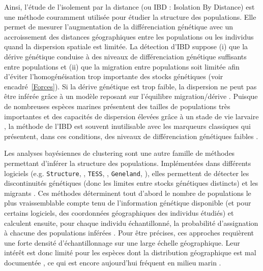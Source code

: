 \documentclass[a4paper,12pt,twoside]{article}\usepackage[]{graphicx}\usepackage[]{color}
\begin{document}
\begin {bibunit} [newbst]
Ainsi, l'étude de l'isolement par la distance (ou IBD : Isolation By Distance) est une méthode couramment utilisée pour étudier la structure des populations. Elle permet de mesurer l'augmentation de la différenciation génétique avec un accroissement des distances géographiques entre les populations \citep{rousset1997genetic} ou les individus \citep{rousset2000genetic} quand la dispersion spatiale est limitée. La détection d'IBD suppose (i) que la dérive génétique conduise à des niveaux de différenciation génétique suffisants entre populations et (ii) que la migration entre populations soit limitée afin d'éviter l'homogénéisation trop importante des stocks génétiques (voir encadré~\ref{Forces}). Si la dérive génétique est trop faible, la dispersion ne peut pas être inférée grâce à un modèle reposant sur l'équilibre migration/dérive \citep{gagnaire2015aa}. Puisque de nombreuses espèces marines présentent des tailles de populations très importantes et des capacités de dispersion élevées grâce à un stade de vie larvaire \citep[e.g. chez les poissons et invertébrés][]{dewoody2000microsatellite, mccusker2010positive}, la méthode de l'IBD est souvent inutilisable avec les marqueurs classiques qui présentent, dans ces conditions, des niveaux de différenciation génétiques faibles \citep{selkoe2011marine}.

Les analyses bayésiennes de clustering sont une autre famille de méthodes permettant d'inférer la structure des populations. Implémentées dans différents logiciels (e.g. \texttt{Structure}, \citet{pritchard2000inference}, \texttt{TESS}, \citet{franccois2010spatially}, \texttt{Geneland}, \citet{guillot2012}), elles permettent de détecter les discontinuités génétiques (donc les limites entre stocks génétiques distincts) et les migrants \citep{broquet2009molecular}. Ces méthodes déterminent tout d'abord le nombre de populations le plus vraissemblable compte tenu de l'information génétique disponible (et pour certains logiciels, des coordonnées géographiques des individus étudiés) et calculent ensuite, pour chaque individu échantillonné, la probabilité d'assignation à chacune des populations inférées \citep{pritchard2000inference, corander2003bayesian}. Pour être précises, ces approches requièrent une forte densité d'échantillonnage sur une large échelle géographique. Leur intérêt est donc limité pour les espèces dont la distribution géographique est mal documentée \citep{gagnaire2015aa}, ce qui est encore aujourd'hui fréquent en milieu marin \citep{novak2016predictive}.


\end{bibunit}
\end{document}
